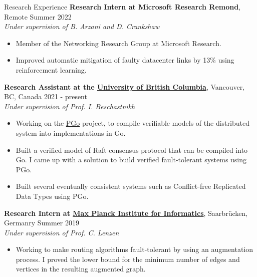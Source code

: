 \documentclass{resume} %
\begin{document}
\begin{rSection}{Research Experience}
  {\bf Research Intern at Microsoft Research Remond},
    {Remote \hfill Summer 2022}
	\\ \textit{Under supervision of B. Arzani and D. Crankshaw} \smallskip
	\vspace{-0.5em}
	\begin{itemize}[leftmargin=3mm]
		\setlength{\itemsep}{1pt}
		\setlength{\parskip}{0pt}
		\setlength{\parsep}{0pt}
		\renewcommand\labelitemi{$\cdot$}

    \item Member of the Networking Research Group at Microsoft Research.
    \item Improved automatic mitigation of faulty datacenter links by 13\%
      using reinforcement learning.
  \end{itemize}


	{\bf Research Assistant at the \href{https://www.ubc.ca/}{University of British Columbia}},
    {Vancouver, BC, Canada \hfill 2021 - present}
	\\ \textit{Under supervision of Prof. I. Beschastnikh} \smallskip
	\vspace{-0.5em}
	\begin{itemize}[leftmargin=3mm]
		\setlength{\itemsep}{1pt}
		\setlength{\parskip}{0pt}
		\setlength{\parsep}{0pt}
		\renewcommand\labelitemi{$\cdot$}

		\item Working on the \href{https://github.com/UBC-NSS/pgo}{PGo} project,
            to compile verifiable models of the distributed system into implementations
            in Go.
		\item Built a verified model of Raft consensus protocol that can be compiled into Go.
			I came up with a solution to build verified fault-tolerant systems using PGo.
		\item Built several eventually consistent systems such as Conflict-free Replicated 
			Data Types using PGo. 
	\end{itemize}

	{\bf Research Intern at \href{https://www.mpi-inf.mpg.de/}{Max Planck Institute for Informatics}}, {Saarbr{\"u}cken, Germanry \hfill Summer 2019}
	\\ \textit{Under supervision of Prof. C. Lenzen} \smallskip
	\vspace{-0.5em}
	\begin{itemize}[leftmargin=3mm]
		\setlength{\itemsep}{1pt}
		\setlength{\parskip}{0pt}
		\setlength{\parsep}{0pt}
		\renewcommand\labelitemi{$\cdot$}

		\item Working to make routing algorithms fault-tolerant by using an augmentation 
            process. I proved the lower bound for the minimum number of edges 
		    and vertices in the resulting augmented graph.
	\end{itemize}
\end{rSection}
\end{document}

